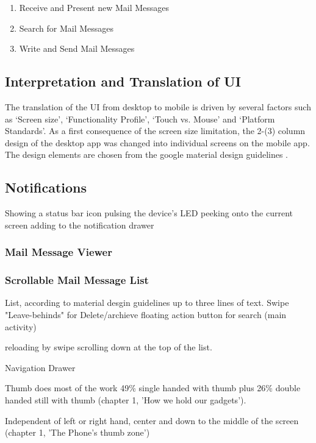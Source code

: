 \documentclass[a4paper,11pt,twoside]{article}
\begin{document}
\begin{enumerate}
  \item Receive and Present new Mail Messages
  \item Search for Mail Messages
  \item Write and Send Mail Messages
\end{enumerate}


\subsection{Interpretation and Translation of UI}
The translation of the UI from desktop to mobile is driven by several factors such
as `Screen size', `Functionality Profile', `Touch vs. Mouse' and `Platform Standards'.
As a first consequence of the screen size limitation, the 2-(3) column design
of the desktop app was changed into individual screens on the mobile app. The design
elements are chosen from the google material design guidelines \cite{materialdesign}.



\subsection{Notifications}
Showing a status bar icon
pulsing the device's LED
peeking onto the current screen
adding to the notification drawer

\subsubsection{Mail Message Viewer}




\subsubsection{Scrollable Mail Message List}
List, according to material desgin guidelines up to three lines of text.
Swipe "Leave-behinds" for Delete/archieve
floating action button for search (main activity)

reloading by swipe scrolling down at the top of the list.

Navigation Drawer

Thumb does most of the work 49\% single handed with thumb plus 26\% double
handed still with thumb (chapter 1, 'How we hold our gadgets').

Independent of left or right hand, center and down to the middle of the screen (chapter 1, 'The Phone's thumb zone')
\end{document}
